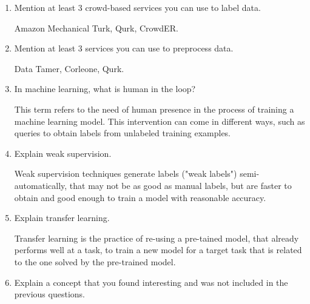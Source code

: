 \documentclass[]{article}
\begin{document}
\begin{enumerate}
    \item Mention at least 3 crowd-based services you can use to label data.
    
    Amazon Mechanical Turk, Qurk, CrowdER.

    \item Mention at least 3 services you can use to preprocess data.
    
    Data Tamer, Corleone, Qurk.

    \item In machine learning, what is human in the loop?
    
    This term refers to the need of human presence in the process of training a machine learning model. This 
    intervention can come in different ways, such as queries to obtain labels from unlabeled training examples.

    \item Explain weak supervision.
    
    Weak supervision techniques generate labels ("weak labels") semi-automatically, that may not be as good as 
    manual labels, but are faster to obtain and good enough to train a model with reasonable accuracy.

    \item Explain transfer learning.
    
    Transfer learning is the practice of re-using a pre-tained model, that already performs well at a task, to 
    train a new model for a target task that is related to the one solved by the pre-trained model.
    
    \item Explain a concept that you found interesting and was not included in the previous questions.
    

\end{enumerate}
\end{document}
